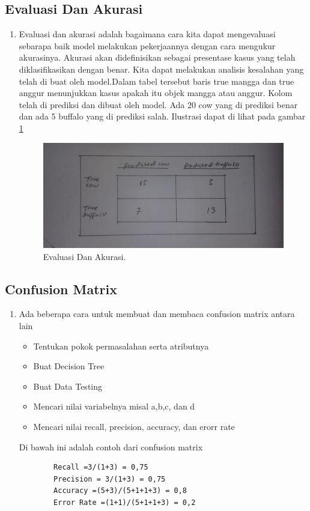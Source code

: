 \subsection{Evaluasi Dan Akurasi}
\begin{enumerate}
\item Evaluasi dan akurasi adalah bagaimana cara kita dapat mengevaluasi sebarapa baik model melakukan pekerjaannya dengan cara mengukur akurasinya. Akurasi akan didefinisikan sebagai presentase kasus yang telah diklasifikasikan dengan benar. Kita dapat melakukan analisis kesalahan yang telah di buat oleh model.Dalam tabel tersebut baris true mangga dan true anggur menunjukkan kasus apakah itu objek mangga atau anggur. Kolom telah di prediksi dan dibuat oleh model. Ada 20 cow yang di prediksi benar dan ada 5 buffalo yang di prediksi salah. Ilustrasi dapat di lihat pada gambar \ref{4}

		\begin{figure}[ht]
		\centerline{\includegraphics[width=1\textwidth]{figures/AIP/4.JPEG}}
		\caption{Evaluasi Dan Akurasi.}
		\label{4}
		\end{figure}
\end{enumerate}

\subsection{Confusion Matrix}
\begin{enumerate}
\item Ada beberapa cara untuk membuat dan membaca confusion matrix antara lain
	\begin{itemize}
		\item Tentukan pokok permasalahan serta atributnya
		\item Buat Decision Tree
		\item Buat Data Testing
		\item Mencari nilai variabelnya misal a,b,c, dan d
		\item Mencari nilai recall, precision, accuracy, dan erorr rate
	\end{itemize}
\subitem Di bawah ini adalah contoh dari confusion matrix
	\begin{verbatim}
		Recall =3/(1+3) = 0,75
		Precision = 3/(1+3) = 0,75
		Accuracy =(5+3)/(5+1+1+3) = 0,8
		Error Rate =(1+1)/(5+1+1+3) = 0,2 
	\end{verbatim}
\end{enumerate}

